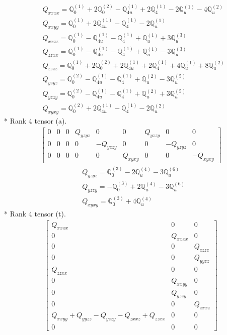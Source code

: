 \documentclass[fleqn,8pt,landscape]{jsarticle}
\begin{document}
\begin{align*}
& Q_{xxxx} = \mathbb{Q}_{0}^{(1)} + 2 \mathbb{Q}_{0}^{(2)} - \mathbb{Q}_{4u}^{(1)} + 2 \mathbb{Q}_{4}^{(1)} - 2 \mathbb{Q}_{u}^{(1)} - 4 \mathbb{Q}_{u}^{(2)} \\
& Q_{xxyy} = \mathbb{Q}_{0}^{(1)} + 2 \mathbb{Q}_{4u}^{(1)} - \mathbb{Q}_{4}^{(1)} - 2 \mathbb{Q}_{u}^{(1)} \\
& Q_{xxzz} = \mathbb{Q}_{0}^{(1)} - \mathbb{Q}_{4u}^{(1)} - \mathbb{Q}_{4}^{(1)} + \mathbb{Q}_{u}^{(1)} + 3 \mathbb{Q}_{u}^{(3)} \\
& Q_{zzxx} = \mathbb{Q}_{0}^{(1)} - \mathbb{Q}_{4u}^{(1)} - \mathbb{Q}_{4}^{(1)} + \mathbb{Q}_{u}^{(1)} - 3 \mathbb{Q}_{u}^{(3)} \\
& Q_{zzzz} = \mathbb{Q}_{0}^{(1)} + 2 \mathbb{Q}_{0}^{(2)} + 2 \mathbb{Q}_{4u}^{(1)} + 2 \mathbb{Q}_{4}^{(1)} + 4 \mathbb{Q}_{u}^{(1)} + 8 \mathbb{Q}_{u}^{(2)} \\
& Q_{yzyz} = \mathbb{Q}_{0}^{(2)} - \mathbb{Q}_{4u}^{(1)} - \mathbb{Q}_{4}^{(1)} + \mathbb{Q}_{u}^{(2)} - 3 \mathbb{Q}_{u}^{(5)} \\
& Q_{yzzy} = \mathbb{Q}_{0}^{(2)} - \mathbb{Q}_{4u}^{(1)} - \mathbb{Q}_{4}^{(1)} + \mathbb{Q}_{u}^{(2)} + 3 \mathbb{Q}_{u}^{(5)} \\
& Q_{xyxy} = \mathbb{Q}_{0}^{(2)} + 2 \mathbb{Q}_{4u}^{(1)} - \mathbb{Q}_{4}^{(1)} - 2 \mathbb{Q}_{u}^{(2)}
\end{align*}
* Rank 4 tensor (a).
\begin{align*}
\begin{bmatrix} 0 & 0 & 0 & Q_{yzyz} & 0 & 0 & Q_{yzzy} & 0 & 0 \\ 0 & 0 & 0 & 0 & - Q_{yzzy} & 0 & 0 & - Q_{yzyz} & 0 \\ 0 & 0 & 0 & 0 & 0 & Q_{xyxy} & 0 & 0 & - Q_{xyxy} \end{bmatrix}
\end{align*}
\begin{align*}
& Q_{yzyz} = \mathbb{Q}_{0}^{(3)} - 2 \mathbb{Q}_{u}^{(4)} - 3 \mathbb{Q}_{u}^{(6)} \\
& Q_{yzzy} = - \mathbb{Q}_{0}^{(3)} + 2 \mathbb{Q}_{u}^{(4)} - 3 \mathbb{Q}_{u}^{(6)} \\
& Q_{xyxy} = \mathbb{Q}_{0}^{(3)} + 4 \mathbb{Q}_{u}^{(4)}
\end{align*}
* Rank 4 tensor (t).
\begin{align*}
\begin{bmatrix} Q_{xxxx} & 0 & 0 \\ 0 & Q_{xxxx} & 0 \\ 0 & 0 & Q_{zzzz} \\ 0 & 0 & Q_{yyzz} \\ Q_{zzxx} & 0 & 0 \\ 0 & Q_{xxyy} & 0 \\ 0 & Q_{yzzy} & 0 \\ 0 & 0 & Q_{zxxz} \\ Q_{xxyy} + Q_{yyzz} - Q_{yzzy} - Q_{zxxz} + Q_{zzxx} & 0 & 0 \\ 0 & 0 & 0 \end{bmatrix}
\end{align*}
\end{document}
